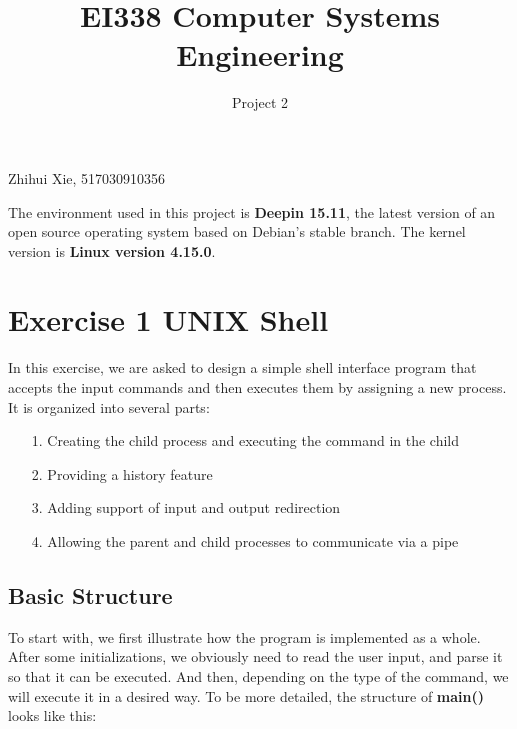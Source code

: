 \documentclass{article}
\title{EI338 Computer Systems Engineering}
\author{Project 2}
\begin{document}
\maketitle

\begin{center}
    Zhihui Xie, 517030910356
\end{center}

The environment used in this project is \textbf{Deepin 15.11}, the latest version of an open source operating system based on Debian's stable branch. The kernel version is \textbf{Linux version 4.15.0}.

\section*{Exercise 1 UNIX Shell}
In this exercise, we are asked to design a simple shell interface program that accepts the input commands and then executes them by assigning a new process. It is organized into several parts:

\begin{itemize}
    \item[1.] Creating the child process and executing the command in the child
    \item[2.] Providing a history feature
    \item[3.] Adding support of input and output redirection
    \item[4.] Allowing the parent and child processes to communicate via a pipe
\end{itemize}

\subsection*{Basic Structure}
To start with, we first illustrate how the program is implemented as a whole. After some initializations, we obviously need to read the user input, and parse it so that it can be executed. And then, depending on the type of the command, we will execute it in a desired way. To be more detailed, the structure of \textbf{main()} looks like this:
\end{document}
